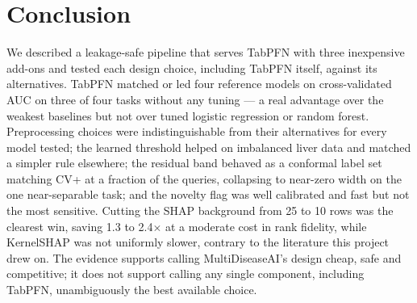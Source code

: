 \documentclass[conference]{IEEEtran}
\begin{document}
\section{Conclusion}

We described a leakage-safe pipeline that serves TabPFN with three inexpensive add-ons and tested each design choice, including TabPFN itself, against its alternatives. TabPFN matched or led four reference models on cross-validated AUC on three of four tasks without any tuning --- a real advantage over the weakest baselines but not over tuned logistic regression or random forest. Preprocessing choices were indistinguishable from their alternatives for every model tested; the learned threshold helped on imbalanced liver data and matched a simpler rule elsewhere; the residual band behaved as a conformal label set matching CV+ at a fraction of the queries, collapsing to near-zero width on the one near-separable task; and the novelty flag was well calibrated and fast but not the most sensitive. Cutting the SHAP background from 25 to 10 rows was the clearest win, saving 1.3 to 2.4$\times$ at a moderate cost in rank fidelity, while KernelSHAP was not uniformly slower, contrary to the literature this project drew on. The evidence supports calling MultiDiseaseAI's design cheap, safe and competitive; it does not support calling any single component, including TabPFN, unambiguously the best available choice.




\end{document}
